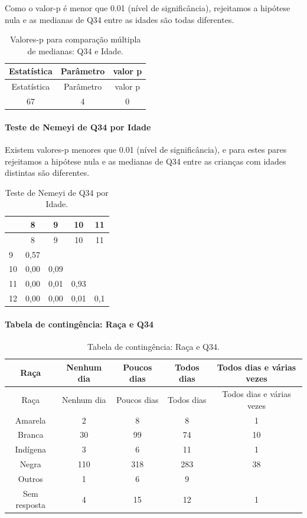 \documentclass[]{article}
\let\oldparagraph\paragraph
\renewcommand{\paragraph}[1]{\oldparagraph{#1}\mbox{}}
\begin{document}
Como o valor-p é menor que 0.01 (nível de significância), rejeitamos a hipótese nula e as medianas de Q34 entre as idades são todas diferentes.

\begin{longtable}[]{@{}ccc@{}}
\caption{\label{tab:unnamed-chunk-1220}Valores-p para comparação múltipla de medianas: Q34 e Idade.}\tabularnewline
\toprule
Estatística & Parâmetro & valor p\tabularnewline
\midrule
\endfirsthead
\toprule
Estatística & Parâmetro & valor p\tabularnewline
\midrule
\endhead
67 & 4 & 0\tabularnewline
\bottomrule
\end{longtable}

\hypertarget{teste-de-nemeyi-de-q34-por-idade}{%
\paragraph{Teste de Nemeyi de Q34 por Idade}\label{teste-de-nemeyi-de-q34-por-idade}}

Existem valores-p menores que 0.01 (nível de significância), e para estes pares rejeitamos a hipótese nula e as medianas de Q34 entre as crianças com idades distintas são diferentes.

\begin{longtable}[]{@{}lcccc@{}}
\caption{\label{tab:unnamed-chunk-1222}Teste de Nemeyi de Q34 por Idade.}\tabularnewline
\toprule
& 8 & 9 & 10 & 11\tabularnewline
\midrule
\endfirsthead
\toprule
& 8 & 9 & 10 & 11\tabularnewline
\midrule
\endhead
9 & 0,57 & & &\tabularnewline
10 & 0,00 & 0,09 & &\tabularnewline
11 & 0,00 & 0,01 & 0,93 &\tabularnewline
12 & 0,00 & 0,00 & 0,01 & 0,1\tabularnewline
\bottomrule
\end{longtable}

\cleardoublepage

\hypertarget{tabela-de-continguxeancia-rauxe7a-e-q34}{%
\paragraph{Tabela de contingência: Raça e Q34}\label{tabela-de-continguxeancia-rauxe7a-e-q34}}

\begin{longtable}[]{@{}ccccc@{}}
\caption{\label{tab:unnamed-chunk-1223}Tabela de contingência: Raça e Q34.}\tabularnewline
\toprule
Raça & Nenhum dia & Poucos dias & Todos dias & Todos dias e várias vezes\tabularnewline
\midrule
\endfirsthead
\toprule
Raça & Nenhum dia & Poucos dias & Todos dias & Todos dias e várias vezes\tabularnewline
\midrule
\endhead
Amarela & 2 & 8 & 8 & 1\tabularnewline
Branca & 30 & 99 & 74 & 10\tabularnewline
Indígena & 3 & 6 & 11 & 1\tabularnewline
Negra & 110 & 318 & 283 & 38\tabularnewline
Outros & 1 & 6 & 9 &\tabularnewline
Sem resposta & 4 & 15 & 12 & 1\tabularnewline
\bottomrule
\end{longtable}
\end{document}
